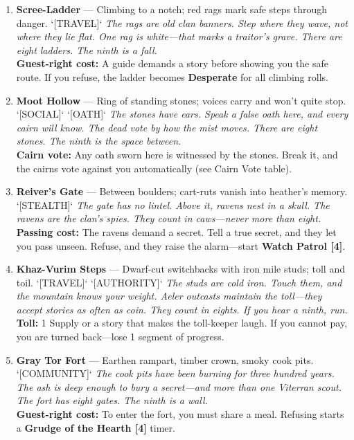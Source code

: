 \begin{enumerate}
\item \textbf{Scree-Ladder} --- Climbing to a notch; red rags mark safe steps through danger. `[TRAVEL]`
  \hfill \textit{The rags are old clan banners. Step where they wave, not where they lie flat. One rag is white---that marks a traitor's grave. There are eight ladders. The ninth is a fall.} \\
  \textbf{Guest-right cost:} A guide demands a story before showing you the safe route. If you refuse, the ladder becomes \textbf{Desperate} for all climbing rolls.

\item \textbf{Moot Hollow} --- Ring of standing stones; voices carry and won't quite stop. `[SOCIAL]` `[OATH]`
  \hfill \textit{The stones have ears. Speak a false oath here, and every cairn will know. The dead vote by how the mist moves. There are eight stones. The ninth is the space between.} \\
  \textbf{Cairn vote:} Any oath sworn here is witnessed by the stones. Break it, and the cairns vote against you automatically (see Cairn Vote table).

\item \textbf{Reiver's Gate} --- Between boulders; cart-ruts vanish into heather's memory. `[STEALTH]`
  \hfill \textit{The gate has no lintel. Above it, ravens nest in a skull. The ravens are the clan's spies. They count in caws---never more than eight.} \\
  \textbf{Passing cost:} The ravens demand a secret. Tell a true secret, and they let you pass unseen. Refuse, and they raise the alarm---start \textbf{Watch Patrol [4]}.

\item \textbf{Khaz-Vurim Steps} --- Dwarf-cut switchbacks with iron mile studs; toll and toil. `[TRAVEL]` `[AUTHORITY]`
  \hfill \textit{The studs are cold iron. Touch them, and the mountain knows your weight. Aeler outcasts maintain the toll---they accept stories as often as coin. They count in eights. If you hear a ninth, run.} \\
  \textbf{Toll:} 1 Supply or a story that makes the toll-keeper laugh. If you cannot pay, you are turned back---lose 1 segment of progress.

\item \textbf{Gray Tor Fort} --- Earthen rampart, timber crown, smoky cook pits. `[COMMUNITY]`
  \hfill \textit{The cook pits have been burning for three hundred years. The ash is deep enough to bury a secret---and more than one Viterran scout. The fort has eight gates. The ninth is a wall.} \\
  \textbf{Guest-right cost:} To enter the fort, you must share a meal. Refusing starts a \textbf{Grudge of the Hearth [4]} timer.


\end{enumerate}
